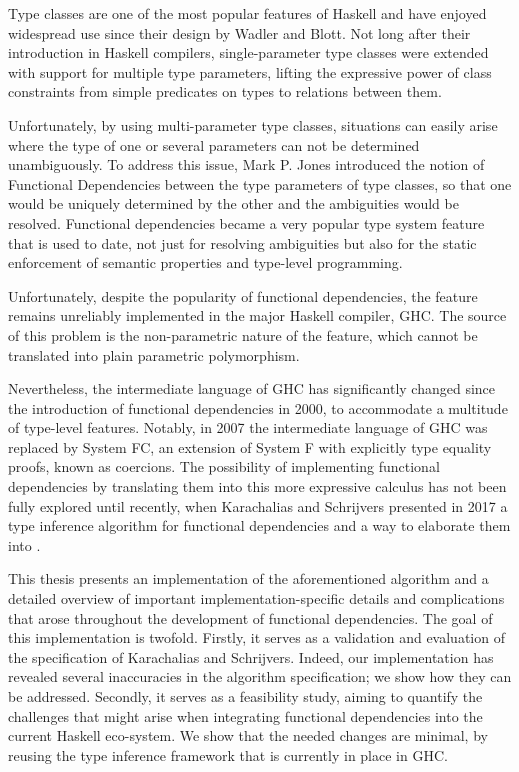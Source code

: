 Type classes are one of the most popular features of Haskell and have enjoyed
widespread use since their design by Wadler and Blott. Not long after their
introduction in Haskell compilers, single-parameter type classes were extended
with support for multiple type parameters, lifting the expressive power of
class constraints from simple predicates on types to relations between them.

Unfortunately, by using multi-parameter type classes, situations can easily
arise where the type of one or several parameters can not be determined
unambiguously. To address this issue, Mark P. Jones introduced the notion of
Functional Dependencies between the type parameters of type classes, so that
one would be uniquely determined by the other and the ambiguities would be
resolved. Functional dependencies became a very popular type system feature
that is used to date, not just for resolving ambiguities but also for the
static enforcement of semantic properties and type-level programming.

Unfortunately, despite the popularity of functional dependencies, the feature
remains unreliably implemented in the major Haskell compiler, GHC. The source
of this problem is the non-parametric nature of the feature, which cannot be
translated into plain parametric polymorphism.

Nevertheless, the intermediate language of GHC has significantly changed since
the introduction of functional dependencies in 2000, to accommodate a multitude
of type-level features. Notably, in 2007 the intermediate language of GHC was
replaced by System FC, an extension of System F with explicitly type equality
proofs, known as coercions. The possibility of implementing functional
dependencies by translating them into this more expressive calculus has not
been fully explored until recently, when Karachalias and Schrijvers presented
in 2017 a type inference algorithm for functional dependencies and a way to
elaborate them into \systemfc.

This thesis presents an implementation of the aforementioned algorithm and a
detailed overview of important implementation-specific details and
complications that arose throughout the development of functional dependencies.
%
The goal of this implementation is twofold.
%
Firstly, it serves as a validation and evaluation of the specification of
Karachalias and Schrijvers. Indeed, our implementation has revealed several
inaccuracies in the algorithm specification; we show how they can be addressed.
%
Secondly, it serves as a feasibility study, aiming to quantify the challenges
that might arise when integrating functional dependencies into the current
Haskell eco-system. We show that the needed changes are minimal, by reusing the
type inference framework that is currently in place in GHC.

